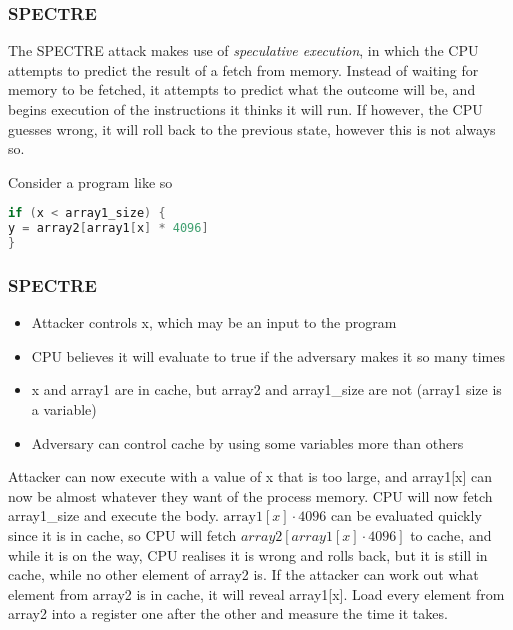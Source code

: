 \documentclass[14pt]{beamer}
\begin{document}
\begin{frame}[fragile]
    \frametitle{SPECTRE}
    The SPECTRE attack makes use of \textit{speculative execution}, in which the CPU attempts to predict the result of a fetch from memory. Instead of waiting for memory to be fetched, it attempts to predict what the outcome will be, and begins execution of the instructions it thinks it will run. If however, the CPU guesses wrong, it will roll back to the previous state, however this is not always so. 

    Consider a program like so
    \begin{lstlisting}[language=C, frame=single]
if (x < array1_size) {
y = array2[array1[x] * 4096]
}
    \end{lstlisting}
\end{frame}

\begin{frame}
    \frametitle{SPECTRE}
        \begin{itemize}
           \item Attacker controls x, which may be an input to the program 
           \item CPU believes it will evaluate to true if the adversary makes it so many times
           \item x and array1 are in cache, but array2 and array1\_size are not (array1 size is a variable)
           \item Adversary can control cache by using some variables more than others
        \end{itemize}
        Attacker can now execute with a value of x that is too large, and array1[x] can now be almost whatever they want of the process memory. CPU will now fetch array1\_size and execute the body. $\text{array1}[x] \cdot 4096$ can be evaluated quickly since it is in cache, so CPU will fetch $array2[array1[x] \cdot 4096]$ to cache, and while it is on the way, CPU realises it is wrong and rolls back, but it is still in cache, while no other element of array2 is. If the attacker can work out what element from array2 is in cache, it will reveal array1[x]. Load every element from array2 into a register one after the other and measure the time it takes. 
\end{frame}
 
        
\end{document}
